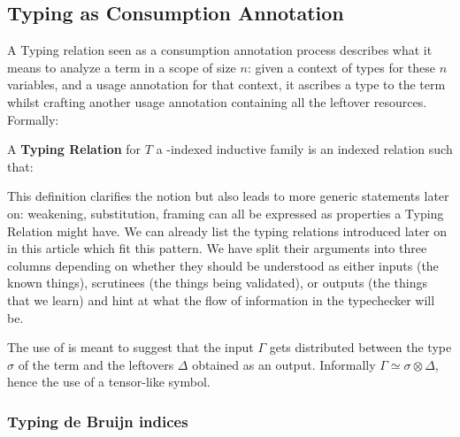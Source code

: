 \subsection{Typing as Consumption Annotation}

A Typing relation seen as a consumption annotation process describes what it
means to analyze a term in a scope of size $n$: given a context of types for
these $n$ variables, and a usage annotation for that context, it ascribes a
type to the term whilst crafting another usage annotation containing all the
leftover resources. Formally:

\begin{definition}
\label{definition:typing}
A \textbf{Typing Relation} for $T$ a \Nat{}-indexed inductive family is
an indexed relation  such that:
\end{definition}

This definition clarifies the notion but also leads to more generic
statements later on: weakening, substitution, framing can all be
expressed as properties a Typing Relation might have. We can already
list the typing relations introduced later on in this article which
fit this pattern. We have split their arguments into three columns
depending on whether they should be understood as either inputs (the
known things), scrutinees (the things being validated), or outputs
(the things that we learn) and hint at what the flow of information
in the typechecker will be.



\begin{remark}The use of \andalso{} is meant to suggest that the input \ensuremath{\Gamma}
gets distributed between the type \ensuremath{\sigma} of the term and the leftovers
\ensuremath{\Delta} obtained as an output. Informally $\ensuremath{\Gamma} \simeq \ensuremath{\sigma} \ensuremath{\otimes} \ensuremath{\Delta}$, hence the
use of a tensor-like symbol.
\end{remark}

\subsubsection{Typing de Bruijn indices}

